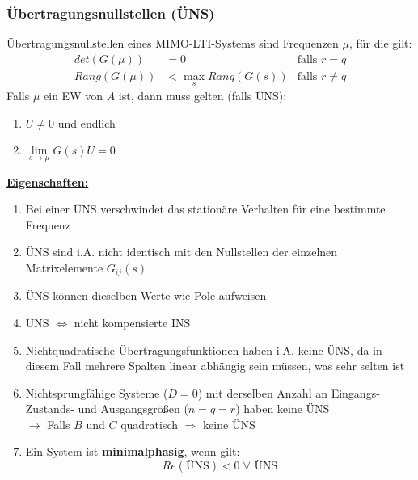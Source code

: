 \documentclass[a4paper,twocolumn,10pt]{article}
\begin{document}
\subsubsection{Übertragungsnullstellen (ÜNS)}
Übertragungsnullstellen eines MIMO-LTI-Systems sind Frequenzen $\mu$, für die gilt:
\begin{align*}
det(G(\mu))&=0&\text{falls }r=q\\
Rang(G(\mu))&<\max\limits_s Rang(G(s))&\text{falls }r\neq q
\end{align*}
Falls $\mu$ ein EW von $A$ ist, dann muss gelten (falls ÜNS):
\begin{enumerate}[label=$\bullet$]
\item $U\neq 0$ und endlich
\item $\lim\limits_{s\rightarrow\mu}G(s)U=0$
\end{enumerate}
\underline{\textbf{Eigenschaften:}}
\begin{enumerate}[label=$\bullet$]
\item Bei einer ÜNS verschwindet das stationäre Verhalten für eine bestimmte Frequenz
\item ÜNS sind i.A. nicht identisch mit den Nullstellen der einzelnen Matrixelemente $G_{ij}(s)$
\item ÜNS können dieselben Werte wie Pole aufweisen
\item ÜNS $\Leftrightarrow$ nicht kompensierte INS
\item Nichtquadratische Übertragungsfunktionen haben i.A. keine ÜNS, da in diesem Fall mehrere Spalten linear abhängig sein müssen, was sehr selten ist
\item Nichtsprungfähige Systeme ($D=0$) mit derselben Anzahl an Eingangs- Zustands- und Ausgangsgrößen ($n=q=r$) haben keine ÜNS\\
$\rightarrow$ Falls $B$ und $C$ quadratisch $\Rightarrow$ keine ÜNS
\item Ein System ist \textbf{minimalphasig}, wenn gilt:
\begin{equation*}
Re(\text{ÜNS})<0\;\forall\text{ ÜNS}
\end{equation*}
\end{enumerate}
\end{document}
